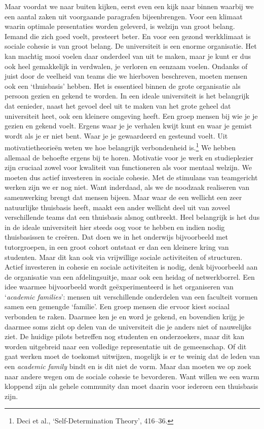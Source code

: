 \documentclass[smallauthor, chapterhaspagenum, nochapterinheader, pagenuminheader,  bigchapnum,medium2, tocpages, garamond, titleinheader]{jote-book}
\begin{document}
	Maar voordat we naar buiten kijken, eerst even een kijk naar binnen waarbij we een aantal zaken uit voorgaande paragrafen bijeenbrengen. Voor een klimaat waarin optimale presentaties worden geleverd, is welzijn van groot belang. Iemand die zich goed voelt, presteert beter. En voor een gezond werkklimaat is sociale cohesie is van groot belang. De universiteit is een enorme organisatie. Het kan machtig mooi voelen daar onderdeel van uit te maken, maar je kunt er dus ook heel gemakkelijk in verdwalen, je verloren en eenzaam voelen. Ondanks of juist door de veelheid van teams die we hierboven beschreven, moeten mensen ook een ‘thuisbasis' hebben. Het is essentieel binnen de grote organisatie als persoon gezien en gekend te worden. In een ideale universiteit is het belangrijk dat eenieder, naast het gevoel deel uit te maken van het grote geheel dat universiteit heet, ook een kleinere omgeving heeft. Een groep mensen bij wie je je gezien en gekend voelt. Ergens waar je je verhalen kwijt kunt en waar je gemist wordt als je er niet bent. Waar je je gewaardeerd en gesteund voelt. Uit motivatietheorieën weten we hoe belangrijk verbondenheid is.\footnote{Deci et al., ‘Self-Determination Theory', 416--36. } We hebben allemaal de behoefte ergens bij te horen. Motivatie voor je werk en studieplezier zijn cruciaal zowel voor kwaliteit van functioneren als voor mentaal welzijn. We moeten dus actief investeren in sociale cohesie. Met de stimulans van teamgericht werken zijn we er nog niet. Want inderdaad, als we de noodzaak realiseren van samenwerking brengt dat mensen bijeen. Maar waar de een wellicht een zeer natuurlijke thuisbasis heeft, maakt een ander wellicht deel uit van zoveel verschillende teams dat een thuisbasis alsnog ontbreekt. Heel belangrijk is het dus in de ideale universiteit hier steeds oog voor te hebben en indien nodig thuisbasissen te creëren. Dat doen we in het onderwijs bijvoorbeeld met tutorgroepen, in een groot cohort ontstaat er dan een kleinere kring van studenten. Maar dit kan ook via vrijwillige sociale activiteiten of structuren. Actief investeren in cohesie en sociale activiteiten is nodig, denk bijvoorbeeld aan de organisatie van een afdelingsuitje, maar ook een heidag of netwerkborrel. Een idee waarmee bijvoorbeeld wordt geëxperimenteerd is het organiseren van ‘\emph{academic}\emph{ families}': mensen uit verschillende onderdelen van een faculteit vormen samen een gemengde ‘familie'. Een groep mensen die ervoor kiest sociaal verbonden te raken. Daarmee ken je en word je gekend, en bovendien krijg je daarmee soms zicht op delen van de universiteit die je anders niet of nauwelijks ziet. De huidige pilots betreffen nog studenten en onderzoekers, maar dit kan worden uitgebreid naar een volledige representatie uit de gemeenschap. Of dit gaat werken moet de toekomst uitwijzen, mogelijk is er te weinig dat de leden van een \emph{academic}\emph{ family} bindt en is dit niet de vorm. Maar dan moeten we op zoek naar andere wegen om de sociale cohesie te bevorderen. Want willen we een warm kloppend zijn als gehele community dan moet daarin voor iedereen een thuisbasis zijn.
\end{document}
